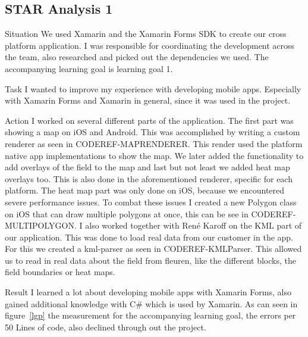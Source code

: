 \documentclass[12pt]{article}
\begin{document}
\subsection{STAR Analysis 1}
\begin{STAR}
    \item[Situation] We used Xamarin and the Xamarin Forms SDK to create our cross platform application. I was responsible for coordinating the development across the team, also researched and picked out the dependencies we used. The accompanying learning goal is learning goal 1.
    \item[Task] I wanted to improve my experience with developing mobile apps. Especially with Xamarin Forms and Xamarin in general, since it was used in the project.
    \item[Action] I worked on several different parts of the application.
    The first part was showing a map on iOS and Android. This was accomplished by writing a custom renderer as seen in CODEREF-MAPRENDERER. This render used the platform native app implementations to show the map.
    We later added the functionality to add overlays of the field to the map and last but not least we added heat map overlays too. This is also done in the aforementioned renderer, specific for each platform. The heat map part was only done on iOS, because we encountered severe performance issues. To combat these issues I created a new Polygon class on iOS that can draw multiple polygons at once, this can be see in CODEREF-MULTIPOLYGON. 
    I also worked together with René Karoff on the KML part of our application. This was done to load real data from our customer in the app. For this we created a kml-parser as seen in CODEREF-KMLParser. This allowed us to read in real data about the field from fleuren, like the different blocks, the field boundaries or heat maps.
     
    \item[Result] I learned a lot about developing mobile apps with Xamarin Forms, also gained additional knowledge with C\# which is used by Xamarin. As can seen in figure~\ref{lgp} the measurement for the accompanying learning goal, the errors per 50 Lines of code, also declined through out the project.
\end{STAR}
\end{document}
